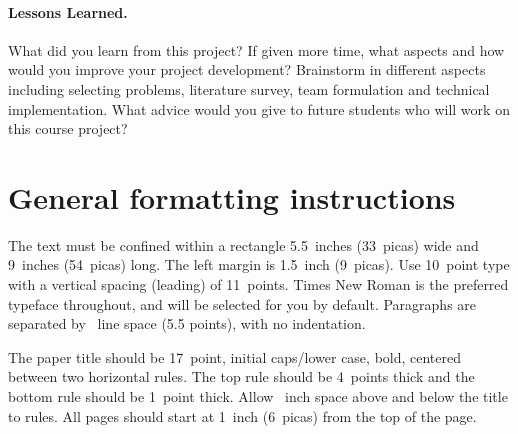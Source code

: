 \documentclass{article}
\begin{document}
\paragraph{Lessons Learned.}
What did you learn from this project?  If given more time, what
aspects and how would you improve your project development?
Brainstorm in different aspects including selecting problems,
literature survey, team formulation and technical implementation.
What advice would you give to future students who will work on this
course project?



\newpage
\section{General formatting instructions}
\label{gen_inst}

The text must be confined within a rectangle 5.5~inches (33~picas) wide and
9~inches (54~picas) long. The left margin is 1.5~inch (9~picas).  Use 10~point
type with a vertical spacing (leading) of 11~points.  Times New Roman is the
preferred typeface throughout, and will be selected for you by default.
Paragraphs are separated by ~line space (5.5 points), with no
indentation.

The paper title should be 17~point, initial caps/lower case, bold, centered
between two horizontal rules. The top rule should be 4~points thick and the
bottom rule should be 1~point thick. Allow ~inch space above and
below the title to rules. All pages should start at 1~inch (6~picas) from the
top of the page.
\end{document}
